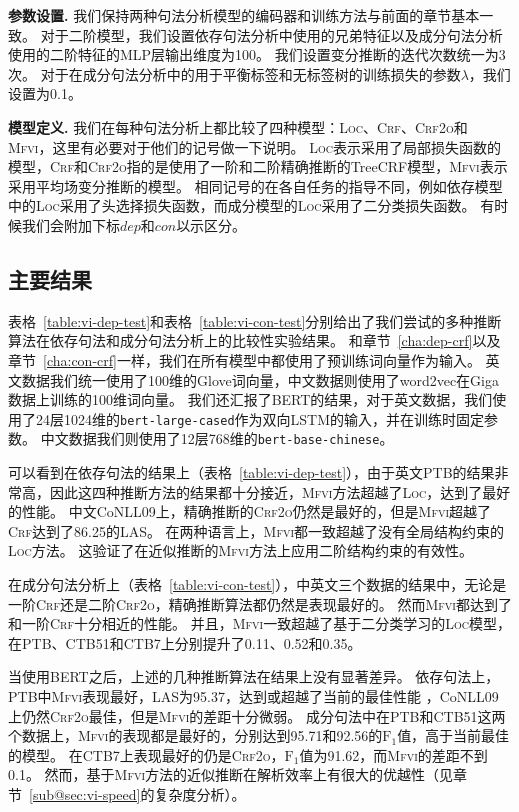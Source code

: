 \noindent\textbf{参数设置.}
我们保持两种句法分析模型的编码器和训练方法与前面的章节基本一致。
对于二阶模型，我们设置依存句法分析中使用的兄弟特征以及成分句法分析使用的二阶特征的MLP层输出维度为100。
我们设置变分推断的迭代次数统一为3次。
对于在成分句法分析中的用于平衡标签和无标签树的训练损失的参数$\lambda$，我们设置为0.1。

\noindent\textbf{模型定义.}
我们在每种句法分析上都比较了四种模型：\textsc{Loc}、\textsc{Crf}、\textsc{Crf2o}和\textsc{Mfvi}，这里有必要对于他们的记号做一下说明。
\textsc{Loc}表示采用了局部损失函数的模型，\textsc{Crf}和\textsc{Crf2o}指的是使用了一阶和二阶精确推断的TreeCRF模型，\textsc{Mfvi}表示采用平均场变分推断的模型。
相同记号的在各自任务的指导不同，例如依存模型中的\textsc{Loc}采用了头选择损失函数，而成分模型的\textsc{Loc}采用了二分类损失函数。
有时候我们会附加下标$dep$和$con$以示区分。



\subsection{主要结果}
表格~\ref{table:vi-dep-test}和表格~\ref{table:vi-con-test}分别给出了我们尝试的多种推断算法在依存句法和成分句法分析上的比较性实验结果。
和章节~\ref{cha:dep-crf}以及章节~\ref{cha:con-crf}一样，我们在所有模型中都使用了预训练词向量作为输入。
英文数据我们统一使用了100维的Glove词向量，中文数据则使用了word2vec在Giga数据上训练的100维词向量。
我们还汇报了BERT的结果，对于英文数据，我们使用了24层1024维的\texttt{bert-large-cased}作为双向LSTM的输入，并在训练时固定参数。
中文数据我们则使用了12层768维的\texttt{bert-base-chinese}。

可以看到在依存句法的结果上（表格~\ref{table:vi-dep-test}），由于英文PTB的结果非常高，因此这四种推断方法的结果都十分接近，\textsc{Mfvi}方法超越了\textsc{Loc}，达到了最好的性能。
中文CoNLL09上，精确推断的\textsc{Crf2o}仍然是最好的，但是\textsc{Mfvi}超越了\textsc{Crf}达到了86.25的LAS。
在两种语言上，\textsc{Mfvi}都一致超越了没有全局结构约束的\textsc{Loc}方法。
这验证了在近似推断的\textsc{Mfvi}方法上应用二阶结构约束的有效性。

在成分句法分析上（表格~\ref{table:vi-con-test}），中英文三个数据的结果中，无论是一阶\textsc{Crf}还是二阶\textsc{Crf2o}，精确推断算法都仍然是表现最好的。
然而\textsc{Mfvi}都达到了和一阶\textsc{Crf}十分相近的性能。
并且，\textsc{Mfvi}一致超越了基于二分类学习的\textsc{Loc}模型，在PTB、CTB51和CTB7上分别提升了0.11、0.52和0.35。

当使用BERT之后，上述的几种推断算法在结果上没有显著差异。
依存句法上，PTB中\textsc{Mfvi}表现最好，LAS为95.37，达到或超越了当前的最佳性能 \citep{zhou-zhao-2019-head,wang-tu-2020-second}，CoNLL09上仍然\textsc{Crf2o}最佳，但是\textsc{Mfvi}的差距十分微弱。
成分句法中在PTB和CTB51这两个数据上，\textsc{Mfvi}的表现都是最好的，分别达到95.71和92.56的$\mathrm{F}_1$值，高于当前最佳的模型\citep{kitaev-etal-2019-multilingual}。
在CTB7上表现最好的仍是\textsc{Crf2o}，$\mathrm{F}_1$值为91.62，而\textsc{Mfvi}的差距不到0.1。
然而，基于\textsc{Mfvi}方法的近似推断在解析效率上有很大的优越性（见章节~\ref{sub@sec:vi-speed}的复杂度分析）。

